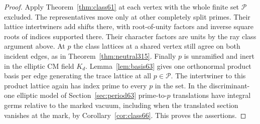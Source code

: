 \documentclass[a4paper,11pt]{article}
\theoremstyle{definition}
\theoremstyle{remark}
\numberwithin{equation}{section}
\begin{document}
\begin{proof}
Apply Theorem~\ref{thm:class61} at each vertex with the whole
finite set \(\mathcal P\) excluded. The representatives move
only at other completely split primes. Their lattice
intertwiners add shifts there, with root-of-unity factors and
inverse square roots of indices supported there. Their character
factors are units by the ray class argument above. At \(p\) the
class lattices at a shared vertex still agree on both incident
edges, as in Theorem~\ref{thm:neutral315}. Finally \(p\) is
unramified and inert in the elliptic CM field \(K_d\).
Lemma~\ref{lem:basis63} gives one orthonormal product basis per
edge generating the trace lattice at all \(p\in\mathcal P\).
The intertwiner to this product lattice again has index prime to
every \(p\) in the set. In the discriminant-one elliptic model
of Section~\ref{sec:period63} prime-to-\(p\) translations
have integral germs relative to the marked vacuum, including
when the translated section vanishes at the mark, by
Corollary~\ref{cor:class66}. This proves the assertions.
\end{proof}
\end{document}
